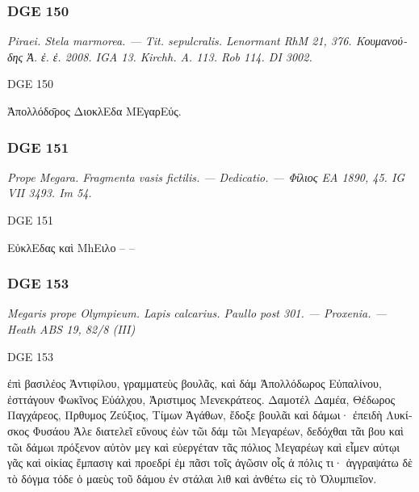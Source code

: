 \subsubsection{DGE 150}
\textit{Piraei. Stela marmorea. — Tit. sepulcralis. Lenormant RhM 21, 376.  \textgreek{Κουμανούδης Ἀ. ἐ. ἐ. } 2008. IGA 13. Kirchh. A. 113. Rob 114. DI 3002.}
\begin{versi}{DGE 150}
\begin{greek}
Ἀπολλόδ{\verso[1]}\={ο}ρος \; Διο{\verso}κλΕδα {\verso} ΜΕγαρΕύς.
\end{greek}
\end{versi}

\hrulefill

\subsubsection{DGE 151}
\textit{Prope Megara. Fragmenta vasis fictilis. — Dedicatio. — \textgreek{Φίλιος} EA 1890, 45. IG VII 3493. Im 54.}
\begin{versi}{DGE 151}
\begin{greek}
Ε{\rbrk}ὐκλΕδας καὶ ΜhΕιλο – –
\end{greek}
\end{versi}

\hrulefill

\subsubsection{DGE 153}
\textit{Megaris prope Olympieum. Lapis calcarius. Paullo post 301. — Proxenia. — Heath ABS 19, 82/8 (III)}
\begin{versi}{DGE 153}
\begin{greek}
ἐπὶ βασιλέος Ἀντιφίλου, {\verso[1]} γραμματεὺς βουλᾶς, καὶ δάμ {\verso} Ἀπολλόδωρος Εὐπαλίνου, ἐσττάγουν Φωκῖνος Εὐάλχου, Ἀριστιμος Μενεκράτεος. Δαμοτέλ {\verso} Δαμέα, Θέδωρος Παγχάρεος, Πρθυμος Ζεύξιος, Τίμων Ἀγάθων, ἔδοξε βουλᾶι καὶ δάμωι· {\verso} ἐπειδὴ Λυκίσκος Φυσάου Ἀλε διατελεῖ εὔνους ἐὼν τῶι δάμ {\verso} τῶι Μεγαρέων, δεδόχθαι τᾶι βου {\verso} καὶ τῶι δάμωι πρόξενον αὐτὸν μεγ καὶ εὐεργέταν τᾶς πόλιος  {\verso} Μεγαρέωγ καὶ εἶμεν αὐτῳι γᾶς καὶ οἰκίας ἔμπασιγ καὶ προεδρί {\verso} ἐμ πᾶσι τοῖς ἀγῶσιν οἷς ἁ πόλις τι· ἀγγραψάτω δὲ τὸ δόγμα τόδε ὁ μαεὺς τοῦ δάμου ἐν στάλαι λιθ {\verso} καὶ ἀνθέτω εἰς τὸ Ὀλυμπιεῖον. 
\end{greek}
\end{versi}

